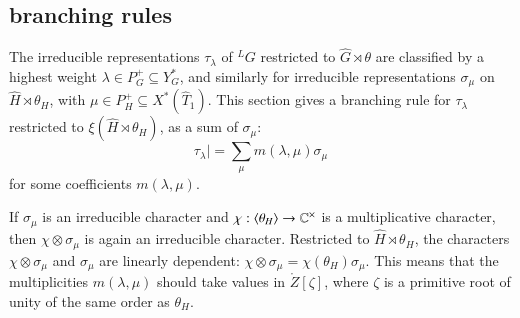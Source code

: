 \subsection{branching rules}\label{sec:branch}

The irreducible representations $\tau_\lambda$ of ${}^LG$ restricted
to $\hat G\rtimes\theta$ are classified by a highest weight
$\lambda\in P^+_G\subseteq Y^*_G$, and similarly for irreducible
representations $\sigma_\mu$ on $\hat H\rtimes \theta_H$, with $\mu\in
P^+_H\subseteq X^*(\hat T_1)$.
This section gives a branching rule for $\tau_\lambda$ restricted to
$\xi(\hat H\rtimes\theta_H)$, as a sum of $\sigma_\mu$:
\[
\tau_\lambda| = \sum_\mu m(\lambda,\mu) \sigma_\mu
\]
for some coefficients $m(\lambda,\mu)$.  

If $\sigma_\mu$ is an irreducible character and
$\chi:\langle{\theta_H}\rangle\to \mathbb{C}^\times$ is a multiplicative
character, then $ \chi\otimes\sigma_\mu$ is again an irreducible
character.  Restricted to $\hat H\rtimes\theta_H$, the characters
$\chi\otimes\sigma_\mu$ and $\sigma_\mu$ are linearly dependent:
$\chi\otimes\sigma_\mu = \chi(\theta_H) \sigma_\mu $.  This
means that the multiplicities $m(\lambda,\mu)$ should take values in
$\ring{Z}[\zeta]$, where $\zeta$ is a primitive root of unity of the
same order as $\theta_H$.


